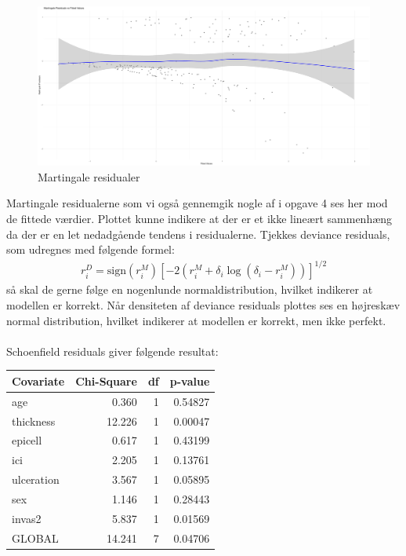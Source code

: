 \newpage
    \begin{figure}[h]
    \centering
    \includegraphics[width=0.49\linewidth]{Basses_kode/Billeder_duration/martingale_residuals_against_fitted_values.pdf}
    \caption{Martingale residualer}
    \label{fig:enter-label}
\end{figure}
\noindent Martingale residualerne som vi også gennemgik nogle af i opgave 4 ses her mod de fittede værdier. Plottet kunne indikere at der er et ikke lineært sammenhæng da der er en let nedadgående tendens i residualerne.
\pause
Tjekkes deviance residuals, som udregnes med følgende formel: 
\begin{align}
r_i^D = \text{sign}(r_i^M) \left[ -2 \left( r_i^M + \delta_i \log(\delta_i - r_i^M) \right) \right]^{1/2}
\end{align} 
så skal de gerne følge en nogenlunde normaldistribution, hvilket indikerer at modellen er korrekt. Når densiteten af deviance residuals plottes ses en højreskæv normal distribution, hvilket indikerer at modellen er korrekt, men ikke perfekt.\\\\

\noindent Schoenfield residuals giver følgende resultat:
\begin{table}[h!]
\centering
\begin{tabular}{lrrr}
\hline
Covariate & Chi-Square & df & p-value \\
\hline
age        & 0.360     & 1  & 0.54827 \\
thickness  & 12.226    & 1  & 0.00047 \\
epicell    & 0.617     & 1  & 0.43199 \\
ici        & 2.205     & 1  & 0.13761 \\
ulceration & 3.567     & 1  & 0.05895 \\
sex        & 1.146     & 1  & 0.28443 \\
invas2     & 5.837     & 1  & 0.01569 \\
\hline
GLOBAL     & 14.241    & 7  & 0.04706 \\
\hline
\end{tabular}
\end{table}

